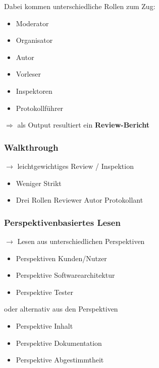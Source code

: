 \documentclass{report}
\theoremstyle{definition}
\theoremstyle{example}
\begin{document}
Dabei kommen unterschiedliche Rollen zum Zug:
\begin{itemize}
   \item Moderator
   \item Organisator
   \item Autor
   \item Vorleser
   \item Inspektoren
   \item Protokollführer
\end{itemize}

$\Rightarrow$ als Output resultiert ein \textbf{Review-Bericht}

\subsubsection{Walkthrough}
$\rightarrow$ leichtgewichtiges Review / Inspektion

\begin{itemize}
   \item Weniger Strikt
   \item Drei Rollen
   \subitem Reviewer
   \subitem Autor
   \subitem Protokollant
\end{itemize}

\subsubsection{Perspektivenbasiertes Lesen}
$\rightarrow$ Lesen aus unterschiedlichen Perspektiven
\begin{itemize}
   \item Perspektiven Kunden/Nutzer
   \item Perspektive Softwarearchitektur
   \item Perspektive Tester
\end{itemize}
oder alternativ aus den Perspektiven
\begin{itemize}
   \item Perspektive Inhalt
   \item Perspektive Dokumentation
   \item Perspektive Abgestimmtheit
\end{itemize}
\end{document}

